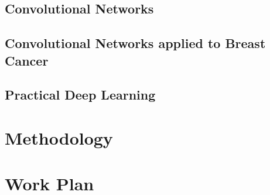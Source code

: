 \documentclass[11pt]{article}
\begin{document}
	\subsection{Convolutional Networks}
	\label{subsec:ConvNets}
	

	\subsection{Convolutional Networks applied to Breast Cancer}
	\label{subsec:BreastCancerConvNets}
	

	\subsection{Practical Deep Learning}
	\label{subsec:PracticalDL}
	

\section{Methodology}
\label{sec:Methodology}


\section{Work Plan}
\label{sec:WorkPlan}




\end{document}
